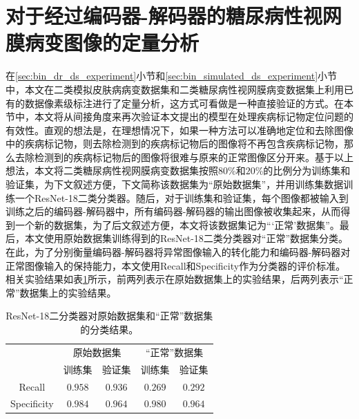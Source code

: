 \section{对于经过编码器-解码器的糖尿病性视网膜病变图像的定量分析}\label{sec:indirect_quantitative_evaluation}
在\ref{sec:bin_dr_ds_experiment}小节和\ref{sec:bin_simulated_ds_experiment}小节中，本文在二类模拟皮肤病病变数据集和二类糖尿病性视网膜病变数据集上利用已有的数据像素级标注进行了定量分析，这方式可看做是一种直接验证的方式。在本节中，本文将从间接角度来再次验证本文提出的模型在处理疾病标记物定位问题的有效性。直观的想法是，在理想情况下，如果一种方法可以准确地定位和去除图像中的疾病标记物，则去除检测到的疾病标记物后的图像将不再包含疾病标记物，那么去除检测到的疾病标记物后的图像将很难与原来的正常图像区分开来。基于以上想法，本文将二类糖尿病性视网膜病变数据集按照$80$\%和$20$\%的比例分为训练集和验证集，为下文叙述方便，下文简称该数据集为“原始数据集”，并用训练集数据训练一个ResNet-18二类分类器。随后，对于训练集和验证集，每个图像都被输入到训练之后的编码器-解码器中，所有编码器-解码器的输出图像被收集起来，从而得到一个新的数据集，为了后文叙述方便，本文将该数据集记为“‘正常’数据集”。最后，本文使用原始数据集训练得到的ResNet-18二类分类器对“正常”数据集分类。在此，为了分别衡量编码器-解码器将异常图像输入的转化能力和编码器-解码器对正常图像输入的保持能力，本文使用Recall和Specificity作为分类器的评价标准。相关实验结果如表\ref{tab:quantitative_retinal}所示，前两列表示在原始数据集上的实验结果，后两列表示“正常”数据集上的实验结果。
\begin{table}[h!]
	\begin{center}
		\caption[ResNet-18二分类器对原始数据集和“正常”数据集分类结果]{ResNet-18二分类器对原始数据集和“正常”数据集的分类结果。} 
		\label{tab:quantitative_retinal}
		\begin{tabular}{c|cc|cc}
			\toprule[2pt]
			& \multicolumn{2}{c|}{原始数据集} & \multicolumn{2}{c}{“正常”数据集} \\
			&  训练集 & 验证集 & 训练集 & 验证集\\
			\midrule[2pt]
			Recall & $0.958$ & $0.936$ & $0.269$ & $0.292$\\ \hline
			Specificity & $0.984$ & $0.964$ & $0.980$ & $0.964$\\
			\bottomrule[2pt]
		\end{tabular} 
	\end{center}
\end{table}


